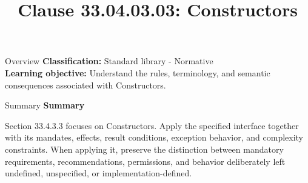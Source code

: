\documentclass[10pt,letterpaper]{article}
\title{Clause 33.04.03.03: Constructors}
\author{}
\date{}
\begin{document}
\maketitle
\begin{CornellOverviewBox}{Overview}
\textbf{Classification:} Standard library - Normative\\[2pt]
\textbf{Learning objective:} Understand the rules, terminology, and semantic consequences associated with Constructors.
\end{CornellOverviewBox}\begin{CornellSummaryBox}{Summary}
{\sffamily\bfseries\color{Accent} Summary}\par\vspace{3pt}Section 33.4.3.3 focuses on Constructors. Apply the specified interface together with its mandates, effects, result conditions, exception behavior, and complexity constraints. When applying it, preserve the distinction between mandatory requirements, recommendations, permissions, and behavior deliberately left undefined, unspecified, or implementation-defined.
\end{CornellSummaryBox}
\end{document}
